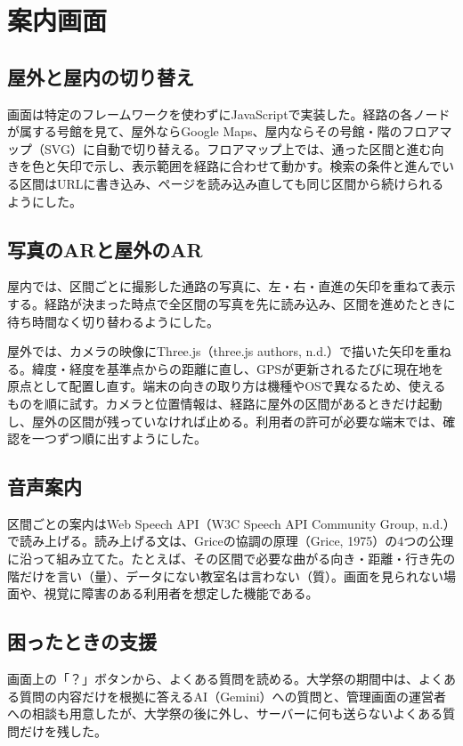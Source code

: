\documentclass[
  paper=a4paper,
  fontsize=10.5pt,
  jafontsize=10.5pt,
  twocolumn,
  line_length=82.5mm,   %
  column_gap=5mm,
  gutter=20mm,          %
  number_of_lines=35,   %
  head_space=25mm,      %
  baselineskip=20.36pt, %
]{jlreq}
\begin{document}
\section{案内画面}

\subsection{屋外と屋内の切り替え}

画面は特定のフレームワークを使わずにJavaScriptで実装した。経路の各ノードが属する号館を見て、屋外ならGoogle Maps、屋内ならその号館・階のフロアマップ（SVG）に自動で切り替える。フロアマップ上では、通った区間と進む向きを色と矢印で示し、表示範囲を経路に合わせて動かす。検索の条件と進んでいる区間はURLに書き込み、ページを読み込み直しても同じ区間から続けられるようにした。

\subsection{写真のARと屋外のAR}

屋内では、区間ごとに撮影した通路の写真に、左・右・直進の矢印を重ねて表示する。経路が決まった時点で全区間の写真を先に読み込み、区間を進めたときに待ち時間なく切り替わるようにした。

屋外では、カメラの映像にThree.js（three.js authors, n.d.）で描いた矢印を重ねる。緯度・経度を基準点からの距離に直し、GPSが更新されるたびに現在地を原点として配置し直す。端末の向きの取り方は機種やOSで異なるため、使えるものを順に試す。カメラと位置情報は、経路に屋外の区間があるときだけ起動し、屋外の区間が残っていなければ止める。利用者の許可が必要な端末では、確認を一つずつ順に出すようにした。

\subsection{音声案内}

区間ごとの案内はWeb Speech API（W3C Speech API Community Group, n.d.）で読み上げる。読み上げる文は、Griceの協調の原理（Grice, 1975）の4つの公理に沿って組み立てた。たとえば、その区間で必要な曲がる向き・距離・行き先の階だけを言い（量）、データにない教室名は言わない（質）。画面を見られない場面や、視覚に障害のある利用者を想定した機能である。

\subsection{困ったときの支援}

画面上の「？」ボタンから、よくある質問を読める。大学祭の期間中は、よくある質問の内容だけを根拠に答えるAI（Gemini）への質問と、管理画面の運営者への相談も用意したが、大学祭の後に外し、サーバーに何も送らないよくある質問だけを残した。
\end{document}
